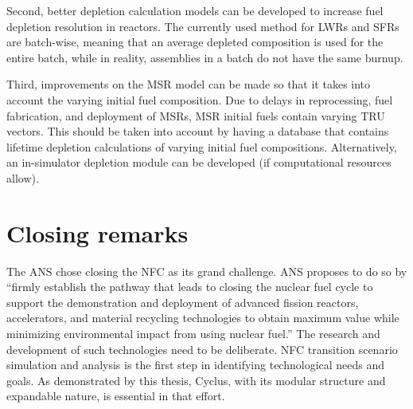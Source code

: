 Second, better depletion calculation models can be developed to increase
fuel depletion resolution in reactors. The currently used method for
\glspl{LWR} and \glspl{SFR} are batch-wise, meaning that an average
depleted composition is used for the entire batch, while in reality,
assemblies in a batch do not have the same burnup.

Third, improvements on the \gls{MSR} model can be made so that it
takes into account the varying initial fuel composition. Due to delays
in reprocessing, fuel fabrication, and deployment of \glspl{MSR}, \gls{MSR}
initial fuels contain varying \gls{TRU} vectors. This should be taken into
account by having a database that contains lifetime depletion calculations
of varying initial fuel compositions. Alternatively, an in-simulator
depletion module can be developed (if computational resources allow).


\section{Closing remarks}
The \gls{ANS} chose closing the \gls{NFC} as its grand challenge. \gls{ANS}
proposes to do so by ``firmly establish the pathway that leads to closing
the nuclear fuel cycle to support the demonstration and deployment of
advanced fission reactors, accelerators, and material recycling technologies
to obtain maximum value while minimizing environmental impact 
from using nuclear fuel.'' The research and development of such technologies
need to be deliberate. \gls{NFC} transition scenario simulation and 
analysis is the first step in identifying technological needs
and goals.  As demonstrated by this thesis, Cyclus, with its
modular structure and expandable nature, is essential in that effort.

